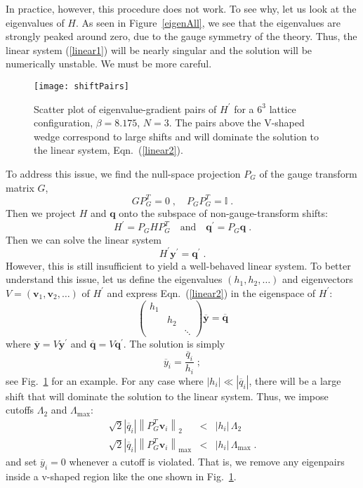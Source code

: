 \documentclass[preprint,aps,prd]{revtex4-2}
\newcommand{\be}{\begin{equation}}
\newcommand{\eq}{\end{equation}}
\newcommand{\heigen}{h}
\begin{document}
In practice, however, this procedure does not work.  To see why, let us
look at the eigenvalues of $H$.  As seen in Figure~\ref{eigenAll},
we see that the eigenvalues are strongly peaked around zero,
due to the gauge symmetry of the theory.  Thus, the linear
system (\ref{linear1}) will be nearly singular and
the solution will be numerically unstable.  We must be more careful.

\begin{figure}
\texttt{[image: shiftPairs]}
\caption{Scatter plot of eigenvalue-gradient pairs of $H^\prime$
  for a $6^3$ lattice configuration, $\beta = 8.175$, $N=3$.
  The pairs above the V-shaped wedge correspond to large shifts and
  will dominate the solution to the linear system, Eqn.~(\ref{linear2}).
  \label{shiftPairs}}
\end{figure}

To address this issue, we find the null-space projection $P_G$
of the gauge transform matrix $G$,
\be
G P_G^T = 0 \; , \quad P_G P_G^T = \mathbb{I}\; .
\eq
Then we project $H$ and $\mathbf{q}$ onto
the subspace of non-gauge-transform shifts:
\be
         H^\prime = P_G H P_G^T \quad \mbox{and} \quad
         \mathbf{q}^\prime = P_G \mathbf{q} \; .
\eq
Then we can solve the linear system
\be
   H^\prime \mathbf{y}^\prime = \mathbf{q}^\prime \; . \label{linear2} 
\eq
However, this is still insufficient to yield a well-behaved linear system.
To better understand this issue, let us define the eigenvalues
$\left(\heigen_1, \heigen_2, \ldots\right)$ and
eigenvectors $V=\left(\mathbf{v}_1, \mathbf{v}_2, \ldots\right)$
of $H^\prime$ and express Eqn.~(\ref{linear2}) in the eigenspace of $H^\prime$:
\be
\begin{pmatrix}
    \heigen_1 & & \\
    & \heigen_2 & \\
    & & \ddots  \end{pmatrix} \overline{\mathbf{y}} =
  \overline{\mathbf{q}} \label{linear3}
\eq
where $\overline{\mathbf{y}} = V \mathbf{y}^\prime$ and
$\overline{\mathbf{q}}  = V \mathbf{q}^\prime$.
The solution is simply
\be
    \overline{y}_i = \frac{\overline{q}_i}{\heigen_i} \; ;
\eq
see Fig.~\ref{shiftPairs} for an example. 
For any case where $\left|\heigen_i\right|\ll \left|\overline{q}_i\right|$,
there will be a large shift that will dominate the solution
to the linear system.
Thus, we impose cutoffs $\Lambda_2$ and $\Lambda_\mathrm{max}$:
\begin{eqnarray}
    \sqrt{2} \left|\overline{q}_i\right|\left\lVert P_G^T \mathbf{v}_i\right\rVert_2
     &<& \left|\heigen_i\right|\,\Lambda_2 \label{lambda2} \\
    \sqrt{2} \left|\overline{q}_i\right|
      \left\lVert P_G^T \mathbf{v}_i\right\rVert_\mathrm{max}
    &<& \left|\heigen_i\right|\,\Lambda_\mathrm{max} \; .
\end{eqnarray}
%
and set $\overline{y}_i=0$ whenever a cutoff is violated.
That is, we remove any eigenpairs inside a v-shaped
region like the one shown in Fig.~\ref{shiftPairs}.  
\end{document}
